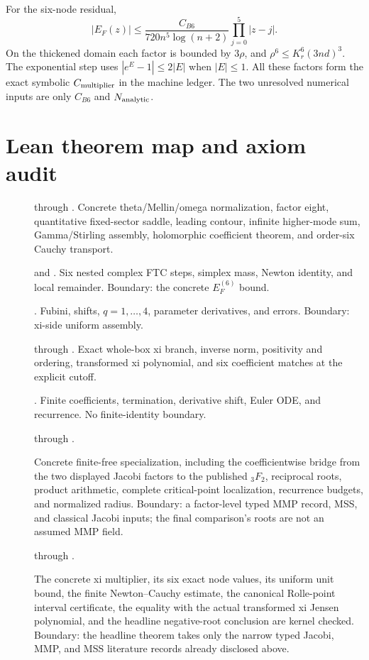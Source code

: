 \documentclass[10pt]{article}
\begin{document}
For the six-node residual,
\[
 |E_F(z)|\le\frac{C_{B6}}{720n^5\log(n+2)}
 \prod_{j=0}^{5}|z-j|.
\]
On the thickened domain each factor is bounded by $3\rho$, and
$\rho^6\le K_r^6(3nd)^3$.  The exponential step uses
$|e^E-1|\le2|E|$ when $|E|\le1$.  All these factors form the exact symbolic
$C_{\rm multiplier}$ in the machine ledger.  The two unresolved numerical
inputs are only $C_{B6}$ and $N_{\rm analytic}$.

\section{Lean theorem map and axiom audit}\label{sup:lean}

\begin{description}
\item[] through .
Concrete theta/Mellin/omega normalization, factor eight, quantitative
fixed-sector saddle, leading contour, infinite higher-mode sum, Gamma/Stirling
assembly, holomorphic coefficient theorem, and order-six Cauchy transport.
\item[] and
.
Six nested complex FTC steps, simplex mass, Newton identity, and local
remainder. Boundary: the concrete $E_F^{(6)}$ bound.
\item[]. Fubini, shifts, $q=1,\ldots,4$,
parameter derivatives, and errors. Boundary: xi-side uniform assembly.
\item[] through .
Exact whole-box xi branch, inverse norm, positivity and ordering, transformed
xi polynomial, and six coefficient matches at the explicit cutoff.
\item[]. Finite coefficients, termination,
derivative shift, Euler ODE, and recurrence. No finite-identity boundary.
\item[] through
.\par
Concrete finite-free specialization, including the coefficientwise bridge
from the two displayed Jacobi factors to the published ${}_3F_2$, reciprocal
roots, product arithmetic, complete critical-point localization, recurrence
budgets, and normalized radius. Boundary: a factor-level typed MMP record,
MSS, and classical Jacobi inputs; the final comparison's roots are not an
assumed MMP field.
\item[] through
.\par
The concrete xi multiplier, its six exact node values, its uniform unit
bound, the finite Newton--Cauchy estimate, the canonical Rolle-point
interval certificate, the equality with the actual transformed xi Jensen
polynomial, and the headline negative-root conclusion are kernel checked.
Boundary: the headline theorem takes only the narrow typed Jacobi, MMP, and
MSS literature records already disclosed above.
\end{description}
\end{document}
